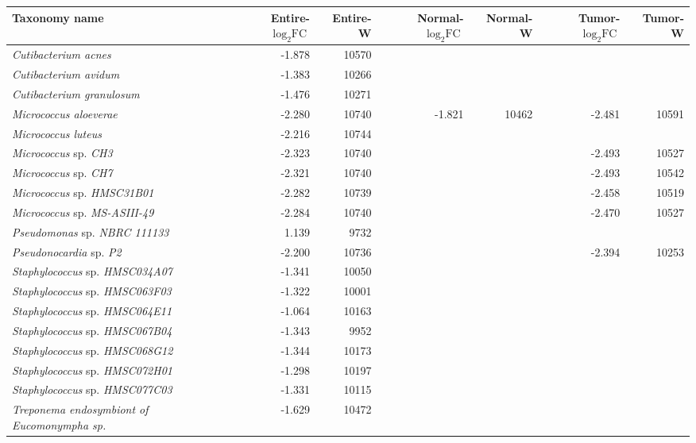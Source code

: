 \begin{tabular}{l|rr|rr|rr}
	Taxonomy name & Entire-$\log _2 \textrm{FC}$ & Entire-W & Normal-$\log _2 \textrm{FC}$ & Normal-W & Tumor-$\log _2 \textrm{FC}$ & Tumor-W \\
\hline
\textit{Cutibacterium acnes} & -1.878 & 10570 &  &  &  &  \\
\textit{Cutibacterium avidum} & -1.383 & 10266 &  &  &  &  \\
\textit{Cutibacterium granulosum} & -1.476 & 10271 &  &  &  &  \\
\textit{Micrococcus aloeverae} & -2.280 & 10740 & -1.821 & 10462 & -2.481 & 10591 \\
\textit{Micrococcus luteus} & -2.216 & 10744 &  &  &  &  \\
\textit{Micrococcus} sp. \textit{CH3} & -2.323 & 10740 &  &  & -2.493 & 10527 \\
\textit{Micrococcus} sp. \textit{CH7} & -2.321 & 10740 &  &  & -2.493 & 10542 \\
\textit{Micrococcus} sp. \textit{HMSC31B01} & -2.282 & 10739 &  &  & -2.458 & 10519 \\
\textit{Micrococcus} sp. \textit{MS-ASIII-49} & -2.284 & 10740 &  &  & -2.470 & 10527 \\
\textit{Pseudomonas} sp. \textit{NBRC 111133} & 1.139 & 9732 &  &  &  &  \\
\textit{Pseudonocardia} sp. \textit{P2} & -2.200 & 10736 &  &  & -2.394 & 10253 \\
\textit{Staphylococcus} sp. \textit{HMSC034A07} & -1.341 & 10050 &  &  &  &  \\
\textit{Staphylococcus} sp. \textit{HMSC063F03} & -1.322 & 10001 &  &  &  &  \\
\textit{Staphylococcus} sp. \textit{HMSC064E11} & -1.064 & 10163 &  &  &  &  \\
\textit{Staphylococcus} sp. \textit{HMSC067B04} & -1.343 & 9952 &  &  &  &  \\
\textit{Staphylococcus} sp. \textit{HMSC068G12} & -1.344 & 10173 &  &  &  &  \\
\textit{Staphylococcus} sp. \textit{HMSC072H01} & -1.298 & 10197 &  &  &  &  \\
\textit{Staphylococcus} sp. \textit{HMSC077C03} & -1.331 & 10115 &  &  &  &  \\
\textit{Treponema endosymbiont of Eucomonympha sp.} & -1.629 & 10472 &  &  &  & 
\end{tabular}